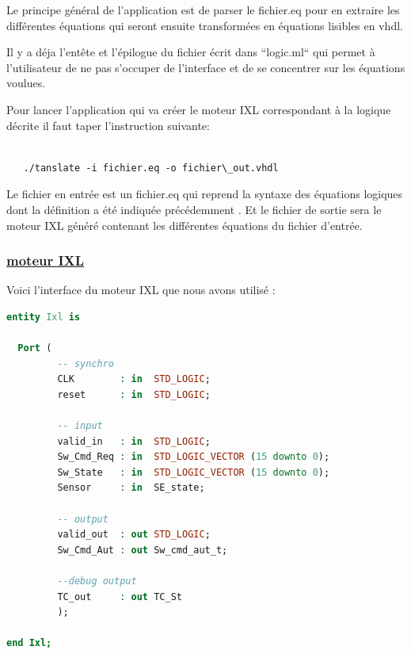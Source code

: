 \medskip

Le principe général de l'application est de parser le fichier.eq pour
en extraire les différentes équations qui seront ensuite transformées en
équations lisibles en vhdl.

\medskip

Il y a déja l'entête et l'épilogue du fichier écrit dans ``logic.ml`` qui
permet à l'utilisateur de ne pas s'occuper de l'interface et de se
concentrer sur les équations voulues.

\medskip

Pour lancer l'application qui va créer le moteur IXL correspondant à la logique décrite il faut taper l'instruction suivante:

\begin{lstlisting}

   ./tanslate -i fichier.eq -o fichier\_out.vhdl

\end{lstlisting}




Le fichier en entrée est un fichier.eq qui reprend la syntaxe des
équations logiques dont la définition a été indiquée précédemment  \cite{Générateur}.
Et le fichier de sortie sera le moteur IXL généré contenant les
différentes équations du fichier d'entrée.

\newpage

\subsubsection{\underline{moteur IXL}}
\label{sec:IXL}

Voici l'interface du moteur IXL que nous avons utilisé :

\begin{lstlisting}[language=vhdl]
entity Ixl is  

  Port (
         -- synchro   
         CLK        : in  STD_LOGIC;
         reset      : in  STD_LOGIC;

         -- input
         valid_in   : in  STD_LOGIC; 
         Sw_Cmd_Req : in  STD_LOGIC_VECTOR (15 downto 0);
         Sw_State   : in  STD_LOGIC_VECTOR (15 downto 0);
         Sensor     : in  SE_state;
         
         -- output
         valid_out  : out STD_LOGIC;
         Sw_Cmd_Aut : out Sw_cmd_aut_t;

         --debug output
         TC_out     : out TC_St
         );

end Ixl;

\end{lstlisting}

